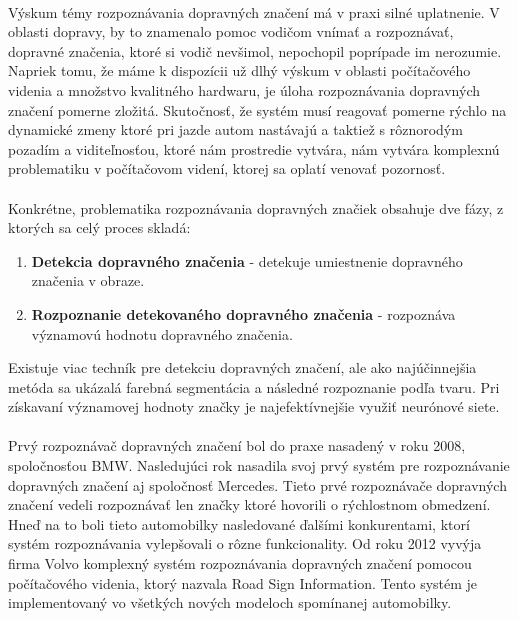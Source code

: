 \documentclass[12pt]{article}
\begin{document}
\paragraph{}
Výskum témy rozpoznávania dopravných značení má v praxi silné uplatnenie. V oblasti dopravy, by to znamenalo pomoc vodičom vnímať a rozpoznávať, dopravné značenia, ktoré si vodič nevšimol, nepochopil poprípade im nerozumie.
Napriek tomu, že máme k dispozícii už dlhý výskum v oblasti počítačového videnia a množstvo kvalitného hardwaru, je úloha rozpoznávania dopravných značení pomerne zložitá.
Skutočnosť, že systém musí reagovať pomerne rýchlo na dynamické zmeny ktoré pri jazde autom nastávajú a taktiež s rôznorodým pozadím a viditeľnosťou, ktoré nám prostredie vytvára,
nám vytvára komplexnú problematiku v počítačovom videní, ktorej sa oplatí venovať pozornosť.\cite{tfs_pdf}
\paragraph{}
Konkrétne, problematika rozpoznávania dopravných značiek obsahuje dve fázy, z ktorých sa celý proces skladá:
\begin{enumerate}
  \item \textbf{Detekcia dopravného značenia} - detekuje umiestnenie dopravného značenia v obraze.
  \item \textbf{Rozpoznanie detekovaného dopravného značenia} - rozpoznáva významovú hodnotu dopravného značenia.
\end{enumerate} 
Existuje viac techník pre detekciu dopravných značení, ale ako najúčinnejšia metóda sa ukázalá farebná segmentácia a následné rozpoznanie podľa tvaru.
Pri získavaní významovej hodnoty značky je najefektívnejšie využiť neurónové siete.
\cite{tfs_pdf}
\paragraph{}
Prvý rozpoznávač dopravných značení bol do praxe nasadený v roku 2008, spoločnosťou BMW.\cite{bmw} Nasledujúci rok nasadila svoj prvý systém pre rozpoznávanie dopravných značení aj spoločnosť Mercedes.\cite{mercedes}
Tieto prvé rozpoznávače dopravných značení vedeli rozpoznávať len značky ktoré hovorili o rýchlostnom obmedzení. Hneď na to boli tieto automobilky nasledované ďalšími konkurentami, ktorí systém rozpoznávania vylepšovali o rôzne funkcionality.
Od roku 2012 vyvýja firma Volvo komplexný systém rozpoznávania dopravných značení pomocou počítačového videnia, ktorý nazvala Road Sign Information. Tento systém je implementovaný vo všetkých nových modeloch spomínanej automobilky.\cite{volvo}
\end{document}
